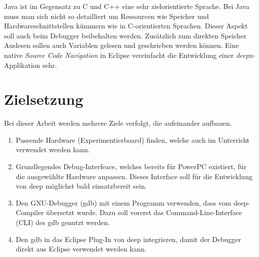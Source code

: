 Java ist im Gegensatz zu C und C++ eine sehr zielorientierte Sprache.
Bei Java muss man sich nicht so detailliert um Ressourcen wie Speicher und Hardwareschnittstellen kümmern wie in C-orientierten Sprachen.
Dieser Aspekt soll auch beim Debugger beibehalten werden.
Zusätzlich zum direkten Speicher Auslesen sollen auch Variablen gelesen und geschrieben werden können.
Eine native \textit{Source Code Navigation} in Eclipse vereinfacht die Entwicklung einer \textit{deep}x-Applikation sehr.



\section{Zielsetzung}
Bei dieser Arbeit werden mehrere Ziele verfolgt, die aufeinander aufbauen.


\begin{enumerate}
\item Passende Hardware (Experimentierboard) finden, welche auch im Unterricht verwendet werden kann.
\item Grundlegendes Debug-Interfeace, welches bereits für PowerPC existiert, für die ausgewählte Hardware anpassen. Dieses Interface soll für die Entwicklung von deep möglichst bald einsatzbereit sein.
\item Den GNU-Debugger (gdb) mit einem Programm verwenden, dass vom deep-Compiler übersetzt wurde. Dazu soll vorerst das Command-Line-Interface (CLI) des gdb genutzt werden.
\item Den gdb in das Eclipse Plug-In von deep integrieren, damit der Debugger direkt aus Eclipse verwendet werden kann.
\end{enumerate}








